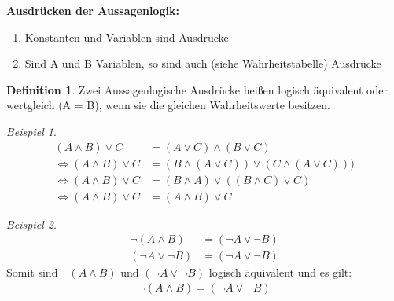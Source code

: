 \documentclass[12pt,a4paper,titlepage]{article} %
\theoremstyle{definition}
\newtheorem{defi}[satz]{Definition}
\theoremstyle{remark}
\newtheorem*{bsp}{Beispiel}
\begin{document}
	\textbf{Ausdrücken der Aussagenlogik:}
	\begin{enumerate}
		\item Konstanten und Variablen sind Ausdrücke
		\item Sind A und B Variablen, so sind auch (siehe Wahrheitstabelle) Ausdrücke
	\end{enumerate}
	\begin{defi}
		Zwei Aussagenlogische Ausdrücke heißen logisch äquivalent oder wertgleich (A = B), wenn sie die gleichen Wahrheitswerte besitzen.
	\end{defi}
	\begin{bsp}
		\begin{align*}
			(A \wedge B) \vee C &= (A \vee C) \wedge (B \vee C)\\
			\Leftrightarrow (A \wedge B) \vee C &= (B \wedge (A \vee C)) \vee (C \wedge (A \vee C)))\\
			\Leftrightarrow (A \wedge B) \vee C &=  (B \wedge A) \vee ((B \wedge C) \vee C)\\
	 		\Leftrightarrow (A \wedge B) \vee C &= (A \wedge B) \vee C
		\end{align*}		
	\end{bsp}
	\begin{bsp}
		\begin{align*}
			\neg(A \wedge B) &= (\neg A \vee \neg B)\\
			(\neg A \vee \neg B) &= (\neg A \vee \neg B)
		\end{align*}
		Somit sind \(\neg(A \wedge B)\) und \((\neg A \vee \neg B)\) logisch äquivalent und es gilt:
		\begin{align*}
			\neg(A \wedge B) = (\neg A \vee \neg B)
		\end{align*}
	\end{bsp}
\end{document}
